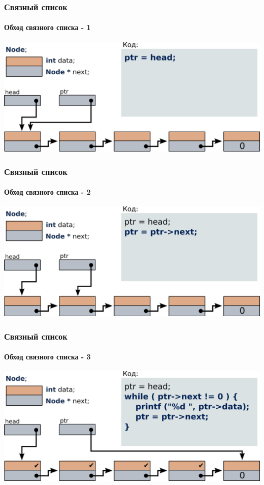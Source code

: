\documentclass[12pt,pdf,hyperref={unicode}]{beamer}
\begin{document}
\begin{frame}[fragile]
\frametitle{Связный список} 
\framesubtitle{Обход связного списка - 1} 
\begin{center}
\includegraphics[width=0.99\linewidth]{images/list_traversal_1.png}
\end{center}
\end{frame}
\begin{frame}[fragile]
\frametitle{Связный список} 
\framesubtitle{Обход связного списка - 2} 
\begin{center}
\includegraphics[width=0.99\linewidth]{images/list_traversal_2.png}
\end{center}
\end{frame}
\begin{frame}[fragile]
\frametitle{Связный список} 
\framesubtitle{Обход связного списка - 3} 
\begin{center}
\includegraphics[width=0.99\linewidth]{images/list_traversal_3.png}
\end{center}
\end{frame}
\end{document}
